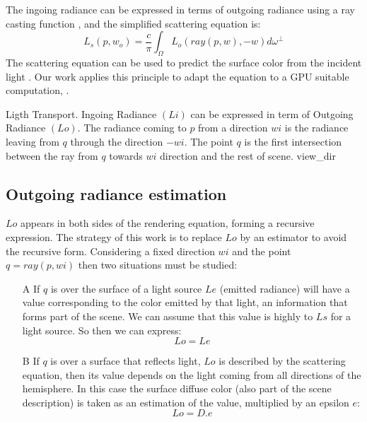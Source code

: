 \documentclass[10pt, conference]{IEEEtran}
\begin{document}
The ingoing radiance can be expressed in terms of outgoing radiance using a ray casting function \cite{ray_casting_function}, and the simplified scattering equation is:
\[
	L_s(p,w_o) = \frac{c}{\pi }\int_ \Omega L_o(ray(p,w), -w)d\omega^\perp
\]
The scattering equation can be used to predict the surface color from the incident light \cite{scattering_equation}. 
Our work applies this principle to adapt the equation to a GPU suitable computation, .

\subimages
	{Ligth Transport. Ingoing Radiance $(Li)$ can be expressed in term of Outgoing Radiance $(Lo)$.
		The radiance coming to $p$ from a direction $wi$ is the radiance leaving from $q$ through the direction $-wi$. 
		The point $q$ is the first intersection between the ray from $q$ towards $wi$ direction and the rest of scene.}
	{view_dir}{
}

\subsection{Outgoing radiance estimation}
%
$Lo$ appears in both sides of the rendering equation, forming a recursive expression. The strategy of this work is to replace $Lo$ by an estimator to avoid the recursive form. 
Considering a fixed direction $wi$ and the point $q = ray(p, wi)$ then two situations must be studied:

\begin{itemize}
	\item[A] If $q$ is over the surface of a light source $Le$ (emitted radiance) will have a value corresponding to the color emitted by that light, an information that forms part of the scene. We can assume that this value is highly to $Ls$ for a light source. So then we can express:
		\begin{equation}
			\label{eq_radiance_case_A}
			Lo = Le 
		\end{equation}
	\item[B] If $q$ is over a surface that reflects light, $Lo$ is described by the scattering equation, then its value depends on the light coming from all directions of the hemisphere. In this case the surface diffuse color (also part of the scene description) is taken as an estimation of the value, multiplied by an epsilon $e$:
		\begin{equation}
			\label{eq_radiance_case_B}
			Lo = D.e 
		\end{equation}
\end{itemize}
\end{document}
